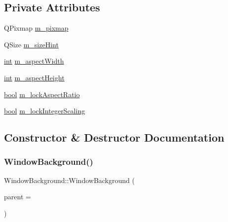 \subsection*{Private Attributes}
\begin{DoxyCompactItemize}
\item 
Q\+Pixmap \mbox{\hyperlink{class_q_g_b_a_1_1_window_background_a622a1fbea3e39fb243fdd3f42dbfeec2}{m\+\_\+pixmap}}
\item 
Q\+Size \mbox{\hyperlink{class_q_g_b_a_1_1_window_background_a95c3165b89901e1b98fdd18c183aea8f}{m\+\_\+size\+Hint}}
\item 
\mbox{\hyperlink{ioapi_8h_a787fa3cf048117ba7123753c1e74fcd6}{int}} \mbox{\hyperlink{class_q_g_b_a_1_1_window_background_aa2b8ab68349803088fbfaca3f7c1b148}{m\+\_\+aspect\+Width}}
\item 
\mbox{\hyperlink{ioapi_8h_a787fa3cf048117ba7123753c1e74fcd6}{int}} \mbox{\hyperlink{class_q_g_b_a_1_1_window_background_aeebcd0e683280dc052083ab1f7e4ada3}{m\+\_\+aspect\+Height}}
\item 
\mbox{\hyperlink{libretro_8h_a4a26dcae73fb7e1528214a068aca317e}{bool}} \mbox{\hyperlink{class_q_g_b_a_1_1_window_background_ad06599849aed6e7bb1ec153736b2bb2d}{m\+\_\+lock\+Aspect\+Ratio}}
\item 
\mbox{\hyperlink{libretro_8h_a4a26dcae73fb7e1528214a068aca317e}{bool}} \mbox{\hyperlink{class_q_g_b_a_1_1_window_background_a129567387adee4af0cc0c5e0fc356f98}{m\+\_\+lock\+Integer\+Scaling}}
\end{DoxyCompactItemize}


\subsection{Constructor \& Destructor Documentation}
\mbox{\label{class_q_g_b_a_1_1_window_background_ac9caf9140745aebb14db70bf3b9843d8}} 
\subsubsection{\texorpdfstring{Window\+Background()}{WindowBackground()}}
{\footnotesize\ttfamily Window\+Background\+::\+Window\+Background (\begin{DoxyParamCaption}\item[{Q\+Widget $\ast$}]{parent = {} }\end{DoxyParamCaption})}



